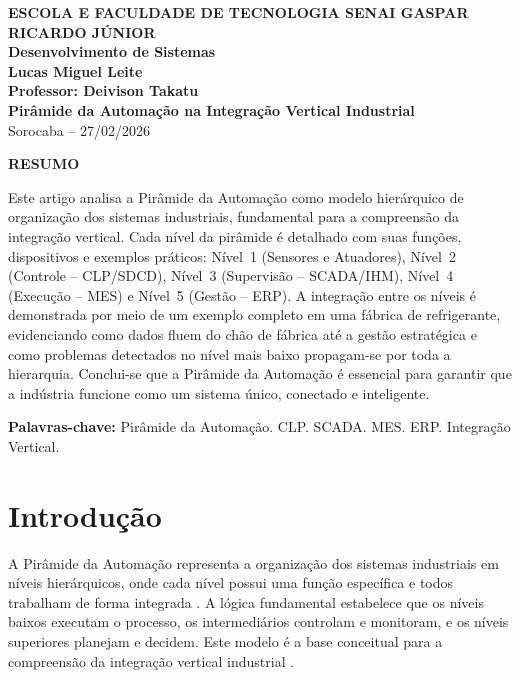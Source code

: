 \documentclass[12pt,a4paper,oneside]{article}
\begin{document}
\begin{center}
  \textbf{\large ESCOLA E FACULDADE DE TECNOLOGIA SENAI GASPAR RICARDO JÚNIOR}\\
  \textbf{Desenvolvimento de Sistemas}\\[1cm]
  \textbf{\Large Lucas Miguel Leite}\\[0.5cm]
  \textbf{Professor: Deivison Takatu}\\[2cm]
  \textbf{\LARGE\textbf{Pirâmide da Automação na Integração Vertical Industrial}}\\[1cm]
  Sorocaba -- 27/02/2026
\end{center}

\vspace{1cm}

\begin{center}
  \textbf{RESUMO}
\end{center}

Este artigo analisa a Pirâmide da Automação como modelo hierárquico de organização dos sistemas industriais, fundamental para a compreensão da integração vertical. Cada nível da pirâmide é detalhado com suas funções, dispositivos e exemplos práticos: Nível~1 (Sensores e Atuadores), Nível~2 (Controle -- CLP/SDCD), Nível~3 (Supervisão -- SCADA/IHM), Nível~4 (Execução -- MES) e Nível~5 (Gestão -- ERP). A integração entre os níveis é demonstrada por meio de um exemplo completo em uma fábrica de refrigerante, evidenciando como dados fluem do chão de fábrica até a gestão estratégica e como problemas detectados no nível mais baixo propagam-se por toda a hierarquia. Conclui-se que a Pirâmide da Automação é essencial para garantir que a indústria funcione como um sistema único, conectado e inteligente.

\vspace{0.5cm}
\textbf{Palavras-chave:} Pirâmide da Automação. CLP. SCADA. MES. ERP. Integração Vertical.

\newpage

\section{Introdução}

A Pirâmide da Automação representa a organização dos sistemas industriais em níveis hierárquicos, onde cada nível possui uma função específica e todos trabalham de forma integrada \cite{moraes2007}. A lógica fundamental estabelece que os níveis baixos executam o processo, os intermediários controlam e monitoram, e os níveis superiores planejam e decidem. Este modelo é a base conceitual para a compreensão da integração vertical industrial \cite{groover2011}.
\end{document}
